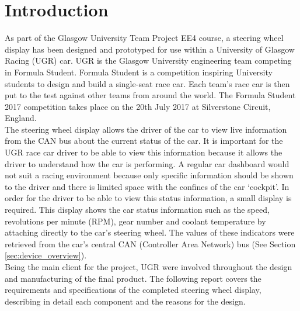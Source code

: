 \documentclass[a4paper,12pt]{article}
\begin{document}

\newpage
\tableofcontents


\newpage
\section{Introduction}
\label{sec:introduction}

As part of the Glasgow University Team Project EE4 course, a steering wheel display has been designed and prototyped for use within a University of Glasgow Racing (UGR) car. UGR is the Glasgow University engineering team competing in Formula Student. Formula Student is a competition inspiring University students to design and build a single-seat race car. Each team's race car is then put to the test against other teams from around the world. The Formula Student 2017 competition takes place on the 20th July 2017 at Silverstone Circuit, England. \\

The steering wheel display allows the driver of the car to view live information from the CAN bus about the current status of the car. It is important for the UGR race car driver to be able to view this information because it allows the driver to understand how the car is performing. A regular car dashboard would not suit a racing environment because only specific information should be shown to the driver and there is limited space with the confines of the car `cockpit'. In order for the driver to be able to view this status information, a small display is required. This display shows the car status information such as the speed, revolutions per minute (RPM), gear number and coolant temperature by attaching directly to the car’s steering wheel. The values of these indicators were retrieved from the car's central CAN (Controller Area Network) bus (See Section \ref{sec:device_overview}). \\

Being the main client for the project, UGR were involved throughout the design and manufacturing of the final product. The following report covers the requirements and specifications of the completed steering wheel display, describing in detail each component and the reasons for the design. \\
\end{document}
